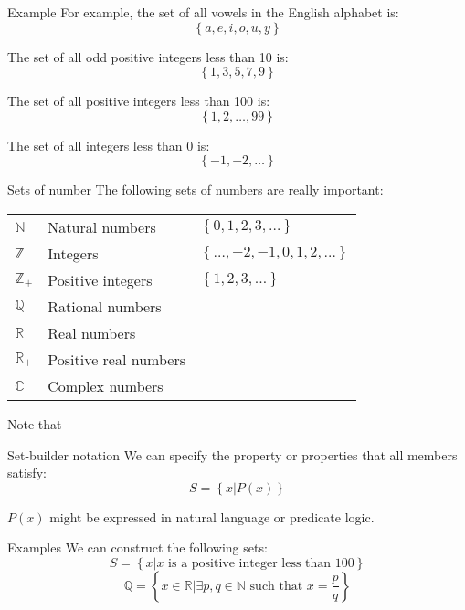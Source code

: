 \documentclass{article}
\begin{document}
\begin{parag}{Example}
    For example, the set of all vowels in the English alphabet is:
    \[\left\{a, e, i, o, u, y\right\}\]

    The set of all odd positive integers less than 10 is: 
    \[\left\{1, 3, 5, 7, 9\right\}\]
    
    The set of all positive integers less than 100 is: 
    \[\left\{1, 2, \ldots, 99\right\}\]
    
    The set of all integers less than 0 is: 
    \[\left\{-1, -2, \ldots\right\}\]
\end{parag}

\begin{parag}{Sets of number}
    The following sets of numbers are really important:
    \begin{center}
    \begin{tabular}{lll}
        $\mathbb{N}$ & Natural numbers & $\left\{0, 1, 2, 3, \ldots\right\}$ \\
        $\mathbb{Z}$ & Integers & $\left\{\ldots, -2, -1, 0, 1, 2, \ldots\right\}$ \\
        $\mathbb{Z}_+$ & Positive integers & $\left\{1, 2, 3, \ldots\right\}$ \\
        $\mathbb{Q}$ & Rational numbers & \\
        $\mathbb{R}$ & Real numbers &  \\
        $\mathbb{R}_+$ & Positive real numbers & \\
        $\mathbb{C}$ & Complex numbers & 
    \end{tabular}
    \end{center}
    
    Note that \textit{}
\end{parag}

\begin{parag}{Set-builder notation}
    We can specify the property or properties that all members satisfy: 
    \[S = \left\{x | P\left(x\right)\right\}\]
    
    $P\left(x\right)$ might be expressed in natural language or predicate logic.

    \begin{subparag}{Examples}
        We can construct the following sets: 
        \[S = \left\{x | x \text{ is a positive integer less than 100}\right\}\]
        \[\mathbb{Q} = \left\{x \in \mathbb{R} | \exists p, q \in \mathbb{N} \text{ such that } x = \frac{p}{q}\right\}\]
    \end{subparag}
\end{parag}
\end{document}
